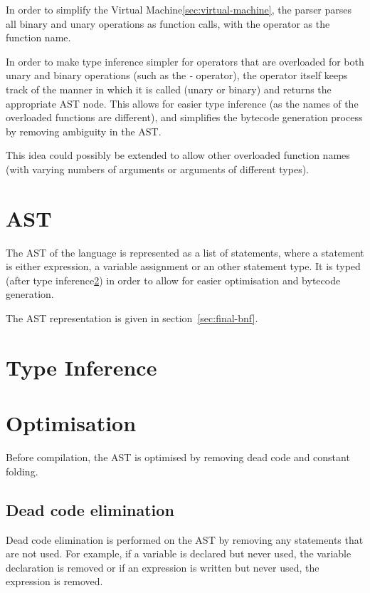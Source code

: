 In order to simplify the Virtual Machine\ref{sec:virtual-machine}, the parser parses all binary and unary operations 
as function calls, with the operator as the function name.

In order to make type inference simpler for operators that are overloaded for both unary and binary operations (such 
as the \textit{-} operator), the operator itself keeps track of the manner in which it is called (unary or binary) and
returns the appropriate AST node. 
This allows for easier type inference (as the names of the overloaded functions are different), 
and simplifies the bytecode generation process by removing ambiguity in the AST\@.

This idea could possibly be extended to allow other overloaded function names (with varying numbers of arguments or 
arguments of different types).

\section{AST}\label{sec:expression}

The AST of the language is represented as a list of statements, where a statement is either expression, a
variable assignment or an other statement type.
It is typed (after type inference\ref{sec:type-inference}) in order to allow for easier optimisation and
bytecode generation.

The AST representation is given in section~\ref{sec:final-bnf}.

\section{Type Inference}\label{sec:type-inference}


\section{Optimisation}\label{sec:optimisation}

Before compilation, the AST is optimised by removing dead code and constant folding.

\subsection{Dead code elimination}\label{subsec:dead-code-elimination}

Dead code elimination is performed on the AST by removing any statements that are not used.
For example, if a variable is declared but never used, the variable declaration is removed or if an expression is
written but never used, the expression is removed.

